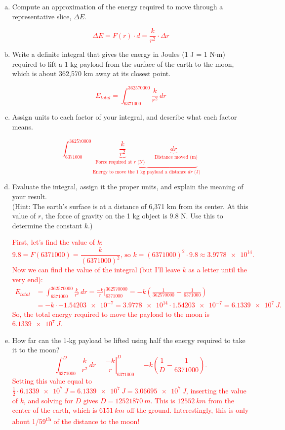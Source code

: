 \documentclass[12pt]{article}
\newcommand{\red}[1]{ \textcolor{red}{#1 } }
\begin{document}
\begin{enumerate}
\begin{enumerate}[(a)]
\red{The issue is that force is a nonconstant function of radius, $F(r)$.}

\item Compute an approximation of the energy required to move through a representative slice, $\Delta E$.

\red{
\[\Delta E = F(r)\cdot d = \frac{k}{r^2}\cdot\Delta r\]
}
\item Write a definite integral that gives the energy in Joules (1 J = 1 N$\cdot$m) required to lift a 1-kg payload from the surface of the earth to the moon, which is about 362,570 km away at its closest point.

\red{
\[E_{total} = \int_{6371000}^{362570000}\frac{k}{r^2}\,dr\]
}

\item Assign units to each factor of your integral, and describe what each factor means.

\red{
\[\int_{6371000}^{362570000} \underbrace{ \underbrace{\frac{k}{r^2} }_{\text{Force required at \(r\) (N)}\quad } \underbrace{dr}_{\quad \text{Distance moved (m)} } }_{ \text{Energy to move the 1 kg payload a distance \(dr\) (J)}} \]
}

\item Evaluate the integral, assign it the proper units, and explain the meaning of your result.\\
(Hint: The earth's surface is at a distance of 6,371 km from its center. At this value of \(r\), the force of gravity on the 1 kg object is 9.8 N. Use this to determine the constant \(k\).)

\red{
    First, let's find the value of $k$:
    \[9.8 = F(6371000) = \frac{k}{(6371000)^2} \text{, so } k = (6371000)^2\cdot 9.8 \approx \num{3.9778e14}. \]
    Now we can find the value of the integral (but I'll leave $k$ as a letter until the very end):
\begin{align*}
E_{total} &= \int_{6371000}^{362570000}\frac{k}{r^2}\,dr = \frac{-k}{r}\bigg|_{6371000}^{362570000} 
= -k\left(\frac{1}{362570000} - \frac{1}{6371000}\right) \\
&= -k\cdot\num{-1.54203e-7} = \num{3.9778e14}\cdot\num{1.54203e-7} = \SI{6.1339e7}{J}.
\end{align*}
So, the total energy required to move the payload to the moon is  $\SI{6.1339e7}{J}$.
}

\item How far can the 1-kg payload be lifted using half the energy required to take it to the
moon? 
\red{
\[
\int_{6371000}^{D}\frac{k}{r^2}\,dr = \left.\frac{-k}{r}\right|_{6371000}^{D}
= -k\left(\frac{1}{D} - \frac{1}{6371000}\right).
\]
Setting this value equal to $\frac{1}{2} \cdot \SI{6.1339e7}{J} = \SI{6.1339e7}{J} = \SI{3.06695e7}{J}$, inserting the value of $k$, and solving for $D$ gives $D = \SI{12521870}{m}$. This is $\SI{12552}{km}$ from the center of the earth, which is $\SI{6151}{km}$ off the ground. Interestingly, this is only about 1/59\textsuperscript{th} of the distance to the moon!
}


\end{enumerate}
\end{enumerate}
\end{document}
